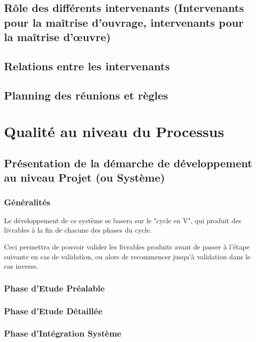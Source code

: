 \documentclass[a4paper]{article}
\begin{document}
\subsection{Rôle des différents intervenants (Intervenants pour la maîtrise d'ouvrage, intervenants pour la maîtrise d'œuvre)}

\subsection{Relations entre les intervenants}

\subsection{Planning des réunions et règles}

\section{Qualité au niveau du Processus}

\subsection{Présentation de la démarche de développement au niveau Projet (ou Système)}

\subsubsection{Généralités}

Le développement de ce système se basera sur le "cycle en V", qui produit des livrables à la fin de chacune des phases du cycle.

Ceci permettra de pouvoir valider les livrables produits avant de passer à l'étape suivante en cas de validation, ou alors de recommencer jusqu'à validation dans le cas inverse.


\subsubsection{Phase d'Etude Préalable}

\subsubsection{Phase d'Etude Détaillée}

\subsubsection{Phase d'Intégration Système}
\end{document}
